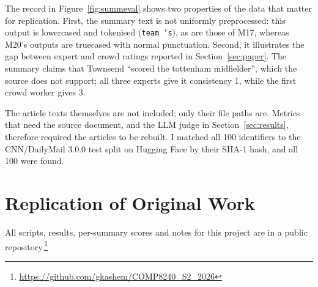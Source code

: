 \documentclass[11pt]{article}
\begin{document}
The record in Figure~\ref{fig:summeval} shows two properties of the data that matter for replication. First, the summary text is not uniformly preprocessed: this output is lowercased and tokenised (\texttt{team 's}), as are those of M17, whereas M20's outputs are truecased with normal punctuation. Second, it illustrates the gap between expert and crowd ratings reported in Section~\ref{sec:paper}. The summary claims that Townsend ``scored the tottenham midfielder'', which the source does not support; all three experts give it consistency 1, while the first crowd worker gives 3.

The article texts themselves are not included; only their file paths are. Metrics that need the source document, and the LLM judge in Section~\ref{sec:results}, therefore required the articles to be rebuilt. I matched all 100 identifiers to the CNN/DailyMail 3.0.0 test split on Hugging Face by their SHA-1 hash, and all 100 were found.

\section{Replication of Original Work}
\label{sec:replication}

All scripts, results, per-summary scores and notes for this project are in a public repository.\footnote{\url{https://github.com/gkashem/COMP8240_S2_2026}}
\end{document}

